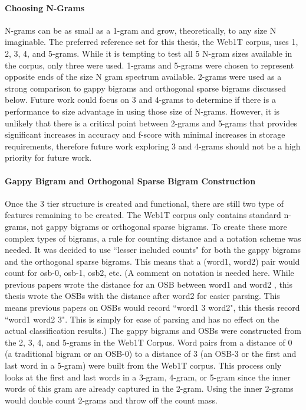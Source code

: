 		\paragraph{Choosing N-Grams} N-grams can be as small as a 1-gram and grow, theoretically, to any size N imaginable.  The preferred reference set for this thesis, the Web1T corpus, uses 1, 2, 3, 4, and 5-grams.  While it is tempting to test all 5 N-gram sizes available in the corpus, only three were used.  1-grams and 5-grams were chosen to represent opposite ends of the size N gram spectrum available.  2-grams were used as a strong comparison to gappy bigrams and orthogonal sparse bigrams discussed below.  Future work could focus on 3 and 4-grams to determine if there is a performance to size advantage in using those size of N-grams.  However, it is unlikely that there is a critical point between 2-grams and 5-grams that provides significant increases in accuracy and f-score with minimal increases in storage requirements, therefore future work exploring 3 and 4-grams should not be a high priority for future work.
		
		\paragraph{Gappy Bigram and Orthogonal Sparse Bigram Construction} Once the 3 tier structure is created and functional, there are still two type of features remaining to be created.  The Web1T corpus only contains standard n-grams, not gappy bigrams or orthogonal sparse bigrams.  To create these more complex types of bigrams, a rule for counting distance and a notation scheme was needed.  It was decided to use ``lesser included counts" for both the gappy bigrams and the orthogonal sparse bigrams.  This means that a (word1, word2) pair would count for osb-0, osb-1, osb2, etc.  (A comment on notation is needed here. While previous papers wrote the distance for an OSB between word1 and word2 \cite{bikel_if_2007}, this thesis wrote the OSBs with the distance after word2 for easier parsing. This means previous papers on OSBs would record ``word1 3 word2", this thesis record ``word1 word2 3".  This is simply for ease of parsing and has no effect on the actual classification results.)  The gappy bigrams and OSBs were constructed from the 2, 3, 4, and 5-grams in the Web1T Corpus.  Word pairs from a distance of 0 (a traditional bigram or an OSB-0) to a distance of 3 (an OSB-3 or the first and last word in a 5-gram) were built from the Web1T corpus.  This process only looks at the first and last words in a 3-gram, 4-gram, or 5-gram since the inner words of this gram are already captured in the 2-gram.  Using the inner 2-grams would double count 2-grams and throw off the count mass.  %
	
